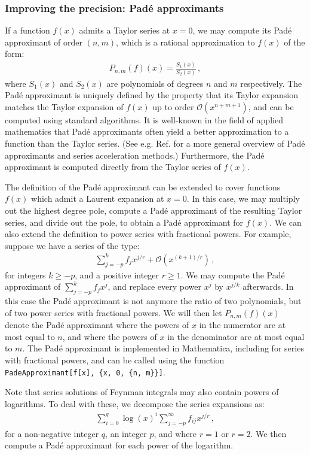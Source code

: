 \documentclass{article}
\begin{document}
\subsubsection{Improving the precision: Padé approximants}
If a function $f(x)$ admits a Taylor series at $x=0$, we may compute its Padé approximant of order $(n,m)$, which is a rational approximation to $f(x)$ of the form:
\begin{align}
    P_{n,m}(f)(x) = \frac{S_1(x)}{S_2(x)}\,,
\end{align}
where $S_1(x)$ and $S_2(x)$ are polynomials of degrees $n$ and $m$ respectively. The Padé approximant is uniquely defined by the property that its Taylor expansion matches the Taylor expansion of $f(x)$ up to order $\mathcal{O}(x^{n+m+1})$, and can be computed using standard algorithms. It is well-known in the field of applied mathematics that Padé approximants often yield a better approximation to a function than the Taylor series. (See e.g. Ref. \cite{bender2013advanced} for a more general overview of Padé approximants and series acceleration methods.) Furthermore, the Padé approximant is computed directly from the Taylor series of $f(x)$.

The definition of the Padé approximant can be extended to cover functions $f(x)$ which admit a Laurent expansion at $x=0$. In this case, we may multiply out the highest degree pole, compute a Padé approximant of the resulting Taylor series, and divide out the pole, to obtain a Padé approximant for $f(x)$. We can also extend the definition to power series with fractional powers. For example, suppose we have a series of the type:
\begin{align}
    \label{eq:laurfracseries}
    \sum_{j=-p}^k f_j x^{j/r} + \mathcal{O}(x^{(k+1)/r})\,,
\end{align}
for integers $k\geq -p$, and a positive integer $r \geq 1$. We may compute the Padé approximant of $\sum_{j=-p}^k f_j x^{j}$, and replace every power $x^j$ by $x^{j/k}$ afterwards. In this case the Padé approximant is not anymore the ratio of two polynomials, but of two power series with fractional powers. We will then let $P_{n,m}(f)(x)$ denote the Padé approximant where the powers of $x$ in the numerator are at most equal to $n$, and where the powers of $x$ in the denominator are at most equal to $m$. The Padé approximant is implemented in Mathematica, including for series with fractional powers, and can be called using the function \texttt{PadeApproximant[f[x], \{x, 0, \{n, m\}\}]}.

Note that series solutions of Feynman integrals may also contain powers of logarithms. To deal with these, we decompose the series expansions as:
\begin{align}
    \sum_{i=0}^q \log(x)^i \sum_{j=-p}^\infty f_{ij} x^{j/r}\,,
\end{align}
for a non-negative integer $q$, an integer $p$, and where $r = 1$ or $r = 2$. We then compute a Padé approximant for each power of the logarithm.
\end{document}

